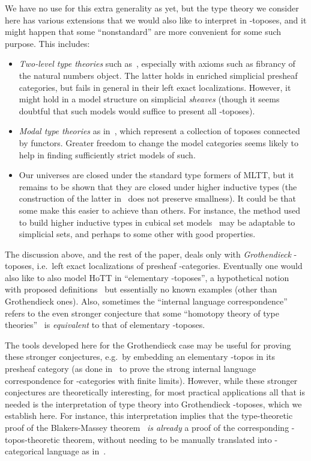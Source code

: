 We have no use for this extra generality as yet, but the type theory we consider here has various extensions that we would also like to interpret in \io-toposes, and it might happen that some ``nonstandard'' \ttmts are more convenient for some such purpose.
This includes:
\begin{itemize}
\item \emph{Two-level type theories} such as~\cite{ack:2ltt}, especially with axioms such as fibrancy of the natural numbers object.
  The latter holds in enriched simplicial presheaf categories, but fails in general in their left exact localizations.
  However, it might hold in a model structure on simplicial \emph{sheaves} (though it seems doubtful that such models would suffice to present all \io-toposes).
\item \emph{Modal type theories} as in~\cite{ls:1var-adjoint-logic,lsr:multi,lsr:depdep}, which represent a collection of toposes connected by functors.
  Greater freedom to change the model categories seems likely to help in finding sufficiently strict models of such.
\item Our universes are closed under the standard type formers of MLTT, but it remains to be shown that they are closed under higher inductive types (the construction of the latter in~\cite{ls:hits} does not preserve smallness).
  It could be that some \ttmts make this easier to achieve than others.
  For instance, the method used to build higher inductive types in cubical set models~\cite{chm:cubical-hits,ch:chtt-iv} may be adaptable to simplicial sets, and perhaps to some other \ttmts with good properties.
\end{itemize}

\begin{rmk}
  The discussion above, and the rest of the paper, deals only with \emph{Grothendieck} \io-toposes, i.e.\ left exact localizations of presheaf \io-categories.
  Eventually one would also like to also model HoTT in ``elementary \io-toposes'', a hypothetical notion with proposed definitions~\cite{shulman:eleminf-talk,rasekh:eleminf} but essentially no known examples (other than Grothendieck ones).
  Also, sometimes the ``internal language correspondence'' refers to the even stronger conjecture that some ``homotopy theory of type theories''~\cite{kl:hot-tt} is \emph{equivalent} to that of elementary \io-toposes.

  The tools developed here for the Grothendieck case may be useful for proving these stronger conjectures, e.g.\ by embedding an elementary \io-topos in its presheaf category (as done in~\cite{ks:intlang-lex} to prove the strong internal language correspondence for \io-categories with finite limits).
  However, while these stronger conjectures are theoretically interesting, for most practical applications all that is needed is the interpretation of type theory into Grothendieck \io-toposes, which we establish here.
  For instance, this interpretation implies that the type-theoretic proof of the Blakers-Massey theorem~\cite{ffll:blakers-massey} \emph{is already} a proof of the corresponding \io-topos-theoretic theorem, without needing to be manually translated into \io-categorical language as in~\cite{abfj:gen-blakers-massey}.
\end{rmk}

